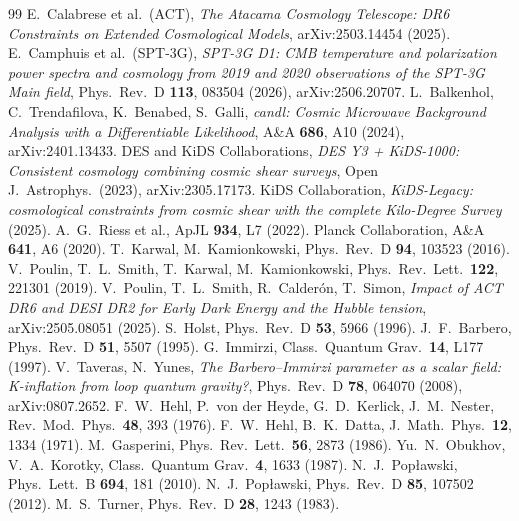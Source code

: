 \documentclass[11pt]{article}
\begin{document}
\begin{thebibliography}{99}
 E.~Calabrese et al.\ (ACT), \emph{The Atacama Cosmology Telescope: DR6
Constraints on Extended Cosmological Models}, arXiv:2503.14454 (2025).
 E.~Camphuis et al.\ (SPT-3G), \emph{SPT-3G D1: CMB temperature and polarization
power spectra and cosmology from 2019 and 2020 observations of the SPT-3G Main field}, Phys.\ Rev.\ D
\textbf{113}, 083504 (2026), arXiv:2506.20707.
 L.~Balkenhol, C.~Trendafilova, K.~Benabed, S.~Galli, \emph{candl: Cosmic
Microwave Background Analysis with a Differentiable Likelihood}, A\&A \textbf{686}, A10 (2024),
arXiv:2401.13433.
 DES and KiDS Collaborations, \emph{DES Y3 + KiDS-1000: Consistent cosmology
combining cosmic shear surveys}, Open J.\ Astrophys.\ (2023), arXiv:2305.17173.
 KiDS Collaboration, \emph{KiDS-Legacy: cosmological constraints from cosmic
shear with the complete Kilo-Degree Survey} (2025).
 A.~G.~Riess et al., ApJL \textbf{934}, L7 (2022).
 Planck Collaboration, A\&A \textbf{641}, A6 (2020).
 T.~Karwal, M.~Kamionkowski, Phys.\ Rev.\ D \textbf{94}, 103523 (2016).
 V.~Poulin, T.~L.~Smith, T.~Karwal, M.~Kamionkowski,
  Phys.\ Rev.\ Lett.\ \textbf{122}, 221301 (2019).
 V.~Poulin, T.~L.~Smith, R.~Calder\'on, T.~Simon,
  \emph{Impact of ACT DR6 and DESI DR2 for Early Dark Energy and the Hubble tension},
  arXiv:2505.08051 (2025).
 S.~Holst, Phys.\ Rev.\ D \textbf{53}, 5966 (1996).
 J.~F.~Barbero, Phys.\ Rev.\ D \textbf{51}, 5507 (1995).
 G.~Immirzi, Class.\ Quantum Grav.\ \textbf{14}, L177 (1997).
 V.~Taveras, N.~Yunes, \emph{The Barbero--Immirzi parameter as a
  scalar field: K-inflation from loop quantum gravity?}, Phys.\ Rev.\ D \textbf{78},
  064070 (2008), arXiv:0807.2652.
 F.~W.~Hehl, P.~von der Heyde, G.~D.~Kerlick, J.~M.~Nester,
  Rev.\ Mod.\ Phys.\ \textbf{48}, 393 (1976).
 F.~W.~Hehl, B.~K.~Datta, J.\ Math.\ Phys.\ \textbf{12}, 1334 (1971).
 M.~Gasperini, Phys.\ Rev.\ Lett.\ \textbf{56}, 2873 (1986).
 Yu.~N.~Obukhov, V.~A.~Korotky, Class.\ Quantum Grav.\
  \textbf{4}, 1633 (1987).
 N.~J.~Pop{\l}awski, Phys.\ Lett.\ B \textbf{694}, 181 (2010).
\bibitem{poplawski2012} N.~J.~Pop{\l}awski, Phys.\ Rev.\ D \textbf{85}, 107502 (2012).
\bibitem{turner1983} M.~S.~Turner, Phys.\ Rev.\ D \textbf{28}, 1243 (1983).

\end{thebibliography}
\end{document}
